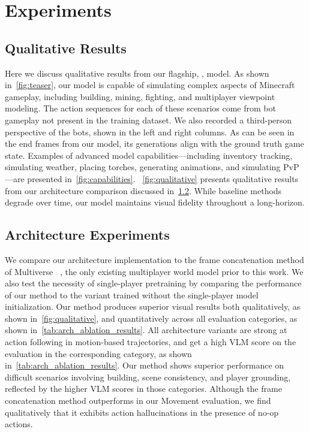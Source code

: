 
\section{Experiments}
\label{sec:experiments}


\subsection{Qualitative Results}
Here we discuss qualitative results from our flagship, \solaris, model. As shown in~\cref{fig:teaser}, our model is capable of simulating complex aspects of Minecraft gameplay, including building, mining, fighting, and multiplayer viewpoint modeling. The action sequences for each of these scenarios come from bot gameplay not present in the training dataset. We also recorded a third-person perspective of the bots, shown in the left and right columns. As can be seen in the end frames from our model, its generations align with the ground truth game state. Examples of advanced model capabilities---including inventory tracking, simulating weather, placing torches, generating animations, and simulating PvP---are presented in~\cref{fig:capabilities}. ~\cref{fig:qualitative} presents qualitative results from our architecture comparison discussed in~\cref{subsec:architecture_experiments}. While baseline methods degrade over time, our model maintains visual fidelity throughout a long-horizon.


\subsection{Architecture Experiments}
\label{subsec:architecture_experiments}


We compare our architecture implementation to the frame concatenation method of Multiverse ~\cite{enigma2025multiverse}, the only existing multiplayer world model prior to this work. We also test the necessity of single-player pretraining by comparing the performance of our method to the variant trained without the single-player model initialization. Our method produces superior visual results both qualitatively, as shown in~\cref{fig:qualitative}, and quantitatively across all evaluation categories, as shown in~\cref{tab:arch_ablation_results}. All architecture variants are strong at action following in motion-based trajectories, and get a high VLM score on the evaluation in the corresponding category, as shown in~\cref{tab:arch_ablation_results}. Our method shows superior performance on difficult scenarios involving building, scene consistency, and player grounding, reflected by the higher VLM scores in those categories. Although the frame concatenation method outperforms in our Movement evaluation, we find qualitatively that it exhibits action hallucinations in the presence of no-op actions. 

